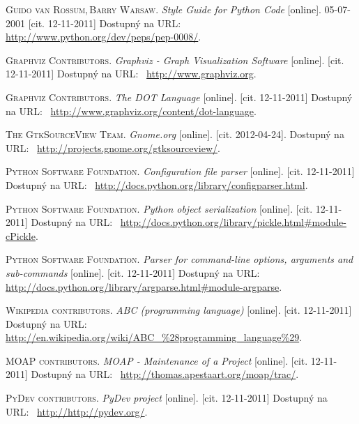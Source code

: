 \documentclass[11pt,oneside,final]{fithesis2}
\begin{document}
\begin{thebibliography}{99}
    \textsc{Guido van Rossum,\,Barry Warsaw}.
    \textit{Style Guide for Python Code} [online].
    05-07-2001
    [cit. 12-11-2011]
    Dostupný na URL:~
    \url{http://www.python.org/dev/peps/pep-0008/}. 
        

    \textsc{Graphviz Contributors}.
    \textit{Graphviz - Graph Visualization Software} [online].
    [cit. 12-11-2011]
    Dostupný na URL:~
    \url{http://www.graphviz.org}.    
                
        
    \textsc{Graphviz Contributors}.
    \textit{The DOT Language} [online].
    [cit. 12-11-2011]
    Dostupný na URL:~
    \url{http://www.graphviz.org/content/dot-language}.    
        
    \textsc{The GtkSourceView Team}.
    \textit{Gnome.org} [online].
    [cit. \mbox{2012-04-24}].
    Dostupný na URL:~
    \url{http://projects.gnome.org/gtksourceview/}.    
        
    \textsc{Python Software Foundation}.
	\textit{Configuration file parser} [online].
    [cit. 12-11-2011]
    Dostupný na URL:~
    \url{http://docs.python.org/library/configparser.html}.    
        
    \textsc{Python Software Foundation}.
    \textit{Python object serialization} [online].
    [cit. 12-11-2011]
    Dostupný na URL:~
    \url{http://docs.python.org/library/pickle.html#module-cPickle}.    
    
    \textsc{Python Software Foundation}.
    \textit{Parser for command-line options, arguments and sub-commands} [online].
    [cit. 12-11-2011]
    Dostupný na URL:~
    \url{http://docs.python.org/library/argparse.html#module-argparse}.  

    \textsc{Wikipedia contributors}.
    \textit{ABC (programming language)} [online].
    [cit. 12-11-2011]
    Dostupný na URL:~
    \url{http://en.wikipedia.org/wiki/ABC_%28programming_language%29}.

    \textsc{MOAP contributors}.
    \textit{MOAP - Maintenance of a Project} [online].
    [cit. 12-11-2011]
    Dostupný na URL:~
    \url{http://thomas.apestaart.org/moap/trac/}.

    \textsc{PyDev contributors}.
    \textit{PyDev project} [online].
    [cit. 12-11-2011]
    Dostupný na URL:~
    \url{http://http://pydev.org/}.
	
\end{thebibliography}
\end{document}
